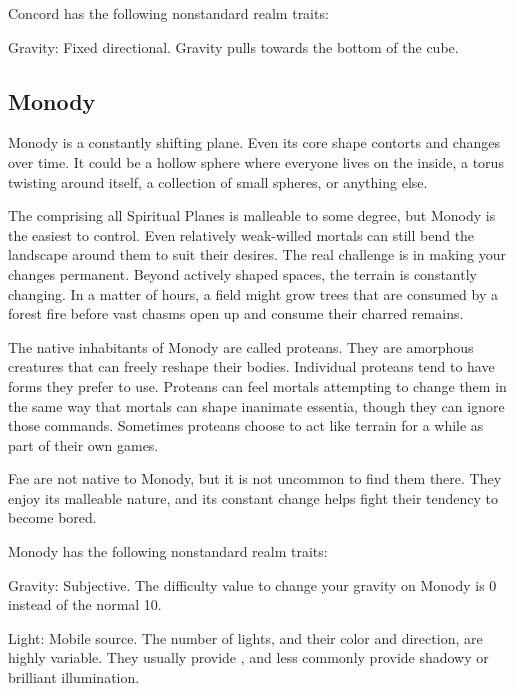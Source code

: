       Concord has the following nonstandard realm traits:
      \begin{raggeditemize}
        \item Gravity: Fixed directional. Gravity pulls towards the bottom of the cube.
      \end{raggeditemize}

  \subsection{Monody}
    Monody is a constantly shifting plane.
    Even its core shape contorts and changes over time.
    It could be a hollow sphere where everyone lives on the inside, a torus twisting around itself, a collection of small spheres, or anything else.

    The  comprising all Spiritual Planes is malleable to some degree, but Monody is the easiest to control.
    Even relatively weak-willed mortals can still bend the landscape around them to suit their desires.
    The real challenge is in making your changes permanent.
    Beyond actively shaped spaces, the terrain is constantly changing.
    In a matter of hours, a field might grow trees that are consumed by a forest fire before vast chasms open up and consume their charred remains.

    The native inhabitants of Monody are called proteans.
    They are amorphous creatures that can freely reshape their bodies.
    Individual proteans tend to have forms they prefer to use.
    Proteans can feel mortals attempting to change them in the same way that mortals can shape inanimate essentia, though they can ignore those commands.
    Sometimes proteans choose to act like terrain for a while as part of their own games.

    Fae are not native to Monody, but it is not uncommon to find them there.
    They enjoy its malleable nature, and its constant change helps fight their tendency to become bored.

    Monody has the following nonstandard realm traits:
    \begin{raggeditemize}
      \item Gravity: Subjective. The difficulty value to change your gravity on Monody is 0 instead of the normal 10.
      \item Light: Mobile source. The number of lights, and their color and direction, are highly variable.
        They usually provide , and less commonly provide shadowy or brilliant illumination.
    \end{raggeditemize}

